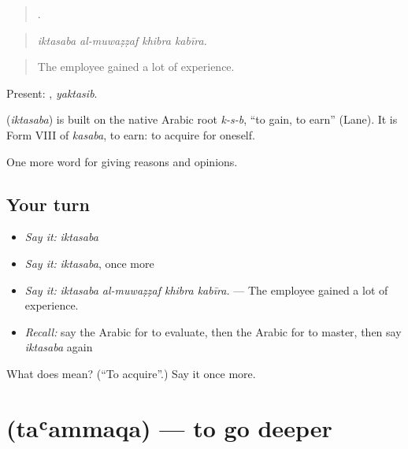 \begin{quote}
   .
\end{quote}

\begin{quote}
\emph{iktasaba al-muwaẓẓaf khibra kabīra.}
\end{quote}

\begin{quote}
The employee gained a lot of experience.
\end{quote}

Present: , \emph{yaktasib}.

\begin{cousinweb}
\textbf{} (\emph{iktasaba}) is built on the native Arabic root \emph{k-s-b}, \textquotedblleft{}to gain, to earn\textquotedblright{} (Lane). It is Form VIII of \emph{kasaba}, to earn: to acquire for oneself.
\end{cousinweb}

\begin{grammarlens}[title={What you've built}]
One more word for giving reasons and opinions.
\end{grammarlens}

\subsection*{Your turn}
\begin{itemize}
\raggedright
  \item \emph{Say it:} \emph{iktasaba}
  \item \emph{Say it:} \emph{iktasaba}, once more
  \item \emph{Say it:} \emph{iktasaba al-muwaẓẓaf khibra kabīra.} — The employee gained a lot of experience.
  \item \emph{Recall:} say the Arabic for to evaluate, then the Arabic for to master, then say \emph{iktasaba} again
\end{itemize}

\begin{tcolorbox}[breakable,colback=teal!4,colframe=teal!35!black,title={Before you move on}]
What does  mean? (\textquotedblleft{}To acquire\textquotedblright{}.) Say it once more.
\end{tcolorbox}
\section[\texorpdfstring{\ar{تعمق} (taʿammaqa)}{تعمق (taʿammaqa)}]{ (taʿammaqa) — to go deeper}

